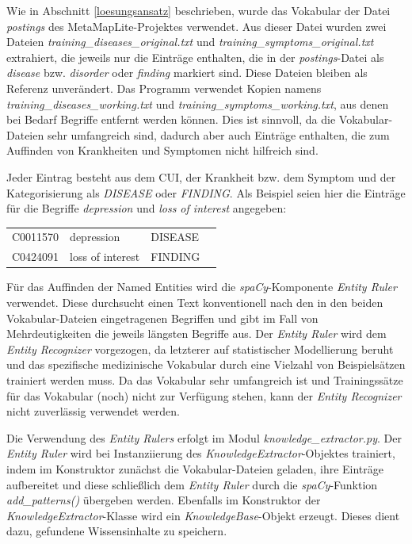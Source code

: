 Wie in Abschnitt \ref{loesungsansatz} beschrieben, wurde das Vokabular der Datei \emph{postings} des MetaMapLite-Projektes verwendet. Aus dieser Datei wurden zwei Dateien \emph{training\_diseases\_original.txt} und \emph{training\_symptoms\_original.txt} extrahiert, die jeweils nur die Einträge enthalten, die in der \emph{postings}-Datei als \emph{disease} bzw. \emph{disorder} oder \emph{finding} markiert sind. Diese Dateien bleiben als Referenz unverändert. Das Programm verwendet Kopien namens \emph{training\_diseases\_working.txt} und \emph{training\_symptoms\_working.txt}, aus denen bei Bedarf Begriffe entfernt werden können. Dies ist sinnvoll, da die Vokabular-Dateien sehr umfangreich sind, dadurch aber auch Einträge enthalten, die zum Auffinden von Krankheiten und Symptomen nicht hilfreich sind.

Jeder Eintrag besteht aus dem CUI, der Krankheit bzw. dem Symptom und der Kategorisierung als \emph{DISEASE} oder \emph{FINDING}. Als Beispiel seien hier die Einträge für die Begriffe \emph{depression} und \emph{loss of interest} angegeben:

\begin{center}
\begin{tabular}{llll}
C0011570 & depression & DISEASE \\
C0424091 & loss of interest & FINDING \\
\end{tabular}
\end{center}

Für das Auffinden der Named Entities wird die \emph{spaCy}-Komponente \emph{Entity Ruler} verwendet. Diese durchsucht einen Text konventionell nach den in den beiden Vokabular-Dateien eingetragenen Begriffen und gibt im Fall von Mehrdeutigkeiten die jeweils längsten Begriffe aus. Der \emph{Entity Ruler} wird dem \emph{Entity Recognizer} vorgezogen, da letzterer auf statistischer Modellierung beruht und das spezifische medizinische Vokabular durch eine Vielzahl von Beispielsätzen trainiert werden muss. Da das Vokabular sehr umfangreich ist und Trainingssätze für das Vokabular (noch) nicht zur Verfügung stehen, kann der \emph{Entity Recognizer} nicht zuverlässig verwendet werden.

Die Verwendung des \emph{Entity Rulers} erfolgt im Modul \emph{knowledge\_extractor.py}. Der \emph{Entity Ruler} wird bei Instanziierung des \emph{KnowledgeExtractor}-Objektes trainiert, indem im Konstruktor zunächst die Vokabular-Dateien geladen, ihre Einträge aufbereitet und diese schließlich dem \emph{Entity Ruler} durch die \emph{spaCy}-Funktion \emph{add\_patterns()} übergeben werden. Ebenfalls im Konstruktor der \emph{KnowledgeExtractor}-Klasse wird ein \emph{KnowledgeBase}-Objekt erzeugt. Dieses dient dazu, gefundene Wissensinhalte zu speichern.

